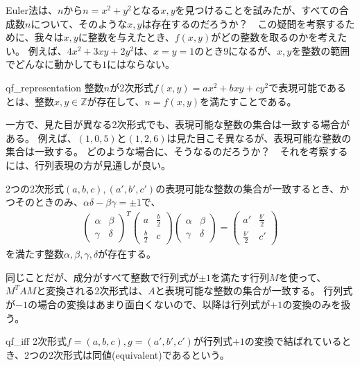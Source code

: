 Euler法は、$n$から$n=x^2+y^2$となる$x,y$を見つけることを試みたが、すべての合成数$n$について、そのような$x,y$は存在するのだろうか？　この疑問を考察するために、我々は$x,y$に整数を与えたとき、$f(x,y)$がどの整数を取るのかを考えたい。
例えば、$4x^2+3xy+2y^2$は、$x=y=1$のとき$9$になるが、$x,y$を整数の範囲でどんなに動かしても$1$にはならない。

\begin{Defi}{}{qf_representation}
整数$n$が2次形式$f(x,y)=ax^2+bxy+cy^2$で表現可能であるとは、整数$x,y\in\mathbb{Z}$が存在して、$n=f(x,y)$を満たすことである。
\end{Defi}

一方で、見た目が異なる2次形式でも、表現可能な整数の集合は一致する場合がある。
例えば、$(1,0,5)$と$(1,2,6)$は見た目こそ異なるが、表現可能な整数の集合は一致する。
どのような場合に、そうなるのだろうか？　それを考察するには、行列表現の方が見通しが良い。

\begin{Prop}{}{}
2つの2次形式$(a,b,c), (a',b',c')$の表現可能な整数の集合が一致するとき、かつそのときのみ、$\alpha\delta-\beta\gamma=\pm1$で、
\begin{align*}
\begin{pmatrix}
\alpha & \beta\\
\gamma & \delta
\end{pmatrix}^T
\begin{pmatrix}
a & \frac{b}{2}\\
\frac{b}{2} & c
\end{pmatrix}
\begin{pmatrix}
\alpha & \beta\\
\gamma & \delta
\end{pmatrix}
=
\begin{pmatrix}
a' & \frac{b'}{2}\\
\frac{b'}{2} & c'
\end{pmatrix}
\end{align*}
を満たす整数$\alpha, \beta, \gamma, \delta$が存在する。
\end{Prop}

同じことだが、成分がすべて整数で行列式が$\pm1$を満たす行列$M$を使って、$M^TAM$と変換される2次形式は、$A$と表現可能な整数の集合が一致する。
行列式が$-1$の場合の変換はあまり面白くないので、以降は行列式が$+1$の変換のみを扱う。

\begin{Defi}{}{qf_iff}
2次形式$f=(a,b,c),g=(a',b',c')$が行列式$+1$の変換で結ばれているとき、2つの2次形式は同値(equivalent)であるという。
\end{Defi}

